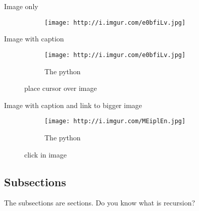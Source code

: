 \documentclass[a4paper,11pt]{article}
\begin{document}
\begin{description}
\item[ Image only]
 \begin{figure}[ht!]
		\centering
		\texttt{[image: http://i.imgur.com/e0bfiLv.jpg]}
		\label{overflow}
		\end{figure}
		
\item[ Image with caption ]
 \begin{figure}[ht!]
		\centering
		\texttt{[image: http://i.imgur.com/e0bfiLv.jpg]}
		\caption{The python}
		\label{overflow}
		\end{figure}
		 
 place cursor over image
\item[ Image with caption and link to bigger image ]
 \begin{figure}[ht!]
		\centering
		\texttt{[image: http://i.imgur.com/MEiplEn.jpg]}
		\caption{The python}
		\label{overflow}
		\end{figure}
		 
 click in image
\end{description}
\subsection{Subsections}
The subsections are sections. Do you know what is recursion?
\end{document}
